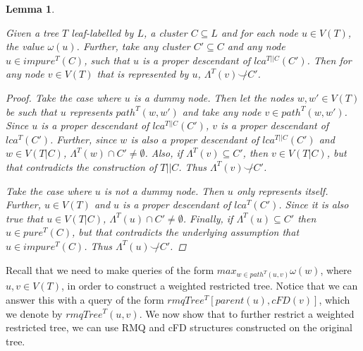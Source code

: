 \documentclass{article}
\newcommand{\compatible}{\smile}
\newcommand{\leafset}{\Lambda}
\newcommand{\weight}{\omega}
\newtheorem{impurenodesincompatible}[incompatibility]{Lemma}
\begin{document}
    \begin{impurenodesincompatible}
        \label{lem:impurenodesincompatible}

        Given a tree $T$ leaf-labelled by $L$, a cluster $C \subseteq L$ and for each node $u \in V(T)$, the value $\weight(u)$. Further, take any cluster $C' \subseteq C$ and any node $u \in impure^{T}(C)$, such that $u$ is a proper descendant of $lca^{T||C}(C')$. Then for any node $v \in V(T)$ that is represented by $u$, $\leafset^{T}(v) \not\compatible C'$.

        \begin{proof}
            Take the case where $u$ is a dummy node. Then let the nodes $w, w' \in V(T)$ be such that $u$ represents $path^{T}(w, w')$ and take any node $v \in path^{T}(w, w')$. Since $u$ is a proper descendant of $lca^{T||C}(C')$, $v$ is a proper descendant of $lca^{T}(C')$. Further, since $w$ is also a proper descendant of $lca^{T||C}(C')$ and $w \in V(T|C)$, $\leafset^{T}(w) \cap C' \neq \emptyset$. Also, if $\leafset^{T}(v) \subseteq C'$, then $v \in V(T|C)$, but that contradicts the construction of $T||C$. Thus $\leafset^{T}(v) \not\compatible C'$.

            Take the case where $u$ is not a dummy node. Then $u$ only represents itself. Further, $u \in V(T)$ and $u$ is a proper descendant of $lca^{T}(C')$. Since it is also true that $u \in V(T|C)$, $\leafset^{T}(u) \cap C' \neq \emptyset$. Finally, if $\leafset^{T}(u) \subseteq C'$ then $u \in pure^{T}(C)$, but that contradicts the underlying assumption that $u \in impure^{T}(C)$. Thus $\leafset^{T}(u) \not\compatible C'$.
        \end{proof}
    \end{impurenodesincompatible}

    Recall that we need to make queries of the form $max_{w \in path^{T}(u, v)} \weight(w)$, where $u, v \in V(T)$, in order to construct a weighted restricted tree. Notice that we can answer this with a query of the form $rmqTree^{T}[parent(u), cFD(v)]$, which we denote by $rmqTree^{T}(u, v)$. We now show that to further restrict a weighted restricted tree, we can use RMQ and cFD structures constructed on the original tree.
    \newline
\end{document}
